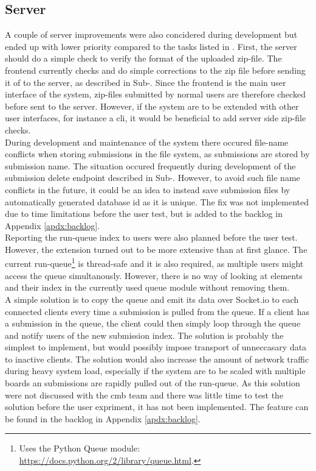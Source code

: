 \subsection{Server}
\label{sec:disc-server}
A couple of server improvements were also concidered during development but ended up with lower priority compared to the tasks listed in . First, the server should do a simple check to verify the format of the uploaded zip-file. The frontend currently checks and do simple corrections to the zip file before sending it of to the server, as described in Sub-. Since the frontend is the main user interface of the system, zip-files submitted by normal users are therefore checked before sent to the server. However, if the system are to be extended with other user interfaces, for instance a \gls{cli}, it would be beneficial to add server side zip-file checks. \\

During development and maintenance of the system there occured file-name conflicts when storing submissions in the file system, as submissions are stored by submission name. The situation occured frequently during development of the submission delete endpoint described in Sub-. However, to avoid such file name conflicts in the future, it could be an idea to instead save submission files by automatically generated database id as it is unique. The fix was not implemented due to time limitations before the user test, but is added to the backlog in Appendix \ref{apdx:backlog}. \\

Reporting the run-queue index to users were also planned before the user test. However, the extension turned out to be more extensive than at first glance. The current run-queue\footnote{Uses the Python Queue module: \url{https://docs.python.org/2/library/queue.html}.} is thread-safe and it is also required, as multiple users might access the queue simultanously. However, there is no way of looking at elements and their index in the currently used queue module without removing them.  \\

A simple solution is to copy the queue and emit its data over Socket.io to each connected clients every time a submission is pulled from the queue. If a client has a submission in the queue, the client could then simply loop through the queue and notify users of the new submission index. The solution is probably the simplest to implement, but would possibly impose transport of unneccasary data to inactive clients. The solution would also increase the amount of network traffic during heavy system load, especially if the system are to be scaled with multiple boards an submissions are rapidly pulled out of the run-queue. As this solution were not discussed with the \gls{cmb} team and there was little time to test the solution before the user expriment, it has not been implemented. The feature can be found in the backlog in Appendix \ref{apdx:backlog}. \\

